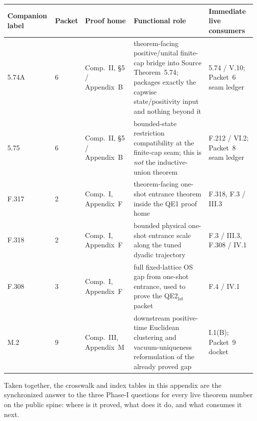 \begingroup
\footnotesize
\setlength{\tabcolsep}{4pt}
\noindent\begin{tabular}{@{}p{}p{}p{}p{}p{}@{}}
\toprule
\textbf{Companion label} & \textbf{Packet} & \textbf{Proof home} & \textbf{Functional role} & \textbf{Immediate live consumers}\\
\midrule
5.74A & 6 & Comp.~II, \S5 / Appendix~B & theorem-facing positive/unital finite-cap bridge into Source Theorem~5.74; packages exactly the capwise state/positivity input and nothing beyond it & 5.74 / V.10; Packet~6 seam ledger\\[0.35em]
5.75 & 6 & Comp.~II, \S5 / Appendix~B & bounded-state restriction compatibility at the finite-cap seam; this is \emph{not} the inductive-union theorem & F.212 / VI.2; Packet~8 seam ledger\\[0.35em]
F.317 & 2 & Comp.~I, Appendix~F & theorem-facing one-shot entrance theorem inside the QE1 proof home & F.318, F.3 / III.3\\[0.35em]
F.318 & 2 & Comp.~I, Appendix~F & bounded physical one-shot entrance scale along the tuned dyadic trajectory & F.3 / III.3, F.308 / IV.1\\[0.35em]
F.308 & 3 & Comp.~I, Appendix~F & full fixed-lattice OS gap from one-shot entrance, used to prove the QE2$_{\mathrm{lat}}$ packet & F.4 / IV.1\\[0.35em]
M.2 & 9 & Comp.~III, Appendix~M & downstream positive-time Euclidean clustering and vacuum-uniqueness reformulation of the already proved gap & I.1(B); Packet~9 docket\\
\bottomrule
\end{tabular}
\endgroup

Taken together, the crosswalk and index tables in this appendix are the synchronized answer to the three Phase-I questions for every live theorem number on the public spine: where is it proved, what does it do, and what consumes it next.
